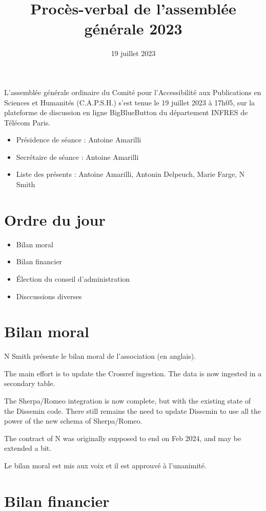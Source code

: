 \documentclass[a4paper]{article}
\title{Procès-verbal de l'assemblée générale 2023}
\date{19 juillet 2023}
\begin{document}
\maketitle

L'assemblée générale ordinaire du Comité pour l'Accessibilité aux Publications
en Sciences et Humanités (C.A.P.S.H.) s'est tenue le 19 juillet 2023 à 17h05,
sur la plateforme de discussion en ligne BigBlueButton du département INFRES de Télécom Paris.

\begin{itemize}
  \item Présidence de séance : Antoine Amarilli
  \item Secrétaire de séance : Antoine Amarilli
  \item Liste des présents : Antoine Amarilli, Antonin Delpeuch, Marie Farge, N
    Smith
\end{itemize}

\section{Ordre du jour}

\begin{itemize}
\item Bilan moral
\item Bilan financier
\item Élection du conseil d'administration
\item Disccussions diverses
\end{itemize}

\section{Bilan moral}

N Smith présente le bilan moral de l'association (en anglais).

The main effort is to update the Crossref ingestion. The data is now ingested in a secondary table.

The Sherpa/Romeo integration is now complete, but with the existing state of the Dissemin code. There still remains the need to update Dissemin to use all the power of the new schema of Sherpa/Romeo.

The contract of N was originally supposed to end on Feb 2024, and may be extended a bit.

Le bilan moral est mis aux voix et il est approuvé à l'unanimité.

\section{Bilan financier}
\end{document}
